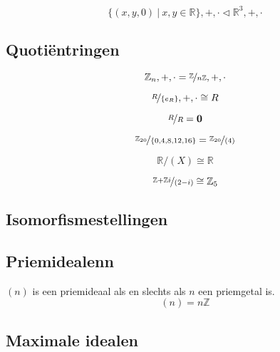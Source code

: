 \documentclass[main.tex]{subfiles}
\begin{document}
\begin{vb}
  \[ \{ (x,y,0) \ |\ x,y \in \mathbb{R} \},+,\cdot \triangleleft \mathbb{R}^{3},+,\cdot \]
\end{vb}

\subsection{Quoti\"entringen}
\label{sec:quotientringen}
 
\begin{vb}
  \[ \mathbb{Z}_{n},+,\cdot = \nicefrac{\mathbb{Z}}{n\mathbb{Z}},+,\cdot \]
\end{vb}

\begin{vb}
  \[ \nicefrac{R}{\{e_{R}\}},+,\cdot \cong R  \]
\end{vb}

\begin{vb}
  \[ \nicefrac{R}{R} = \boldsymbol{0} \]
\end{vb}

\begin{vb}
  \[ \nicefrac{\mathbb{Z}_{20}}{\{0,4,8,12,16\}} = \nicefrac{\mathbb{Z}_{20}}{(4)}  \]
\end{vb}

\begin{vb}
  \[ \mathbb{R}/(X) \cong \mathbb{R} \]
\end{vb}

\begin{vb}
  \[ \nicefrac{\mathbb{Z} + \mathbb{Z}i}{(2-i)} \cong \mathbb{Z}_{5} \]
\end{vb}

\subsection{Isomorfismestellingen}
\label{sec:isom}

\subsection{Priemidealenn}

\begin{vb}
  $(n)$ is een priemideaal als en slechts als $n$ een priemgetal is.
  \[ (n) = n\mathbb{Z} \]
\end{vb}

\subsection{Maximale idealen}
\end{document}
